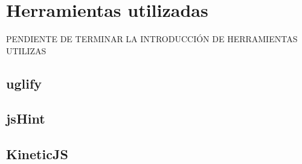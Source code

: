 \newpage\mbox{}\thispagestyle{empty}

\chapter{Herramientas utilizadas}

PENDIENTE DE TERMINAR LA INTRODUCCIÓN DE HERRAMIENTAS UTILIZAS




\section{uglify}
\section{jsHint}
\section{KineticJS}

%